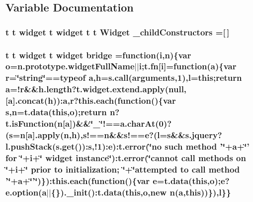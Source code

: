 \subsection{Variable Documentation}
\hypertarget{static_2root_2js_2bootstrap_2jquery-ui-1_810_84_8custom_8min_8js_a82e9fe96f4c63a640d414c9ea1d4fc32}{
\subsubsection[{\-\_\-child\-Constructors}]{ {\bf t} {\bf t} {\bf widget} {\bf t} {\bf widget} {\bf t} {\bf t} {\bf Widget} \-\_\-child\-Constructors =\mbox{[}$\,$\mbox{]}}}\label{static_2root_2js_2bootstrap_2jquery-ui-1_810_84_8custom_8min_8js_a82e9fe96f4c63a640d414c9ea1d4fc32}
\hypertarget{static_2root_2js_2bootstrap_2jquery-ui-1_810_84_8custom_8min_8js_a937dfd5a26af72e715911d045dbd0f69}{
\subsubsection[{bridge}]{ {\bf t} {\bf t} {\bf widget} {\bf t} {\bf widget} bridge =function({\bf i},{\bf n})\{var {\bf o}=n.\-prototype.\-widget\-Full\-Name$\vert$$\vert${\bf i};{\bf t.\-fn}\mbox{[}{\bf i}\mbox{]}=function({\bf a})\{var {\bf r}=\char`\"{}string\char`\"{}==typeof {\bf a},{\bf h}={\bf s.\-call}(arguments,1),{\bf l}=this;return {\bf a}=!{\bf r}\&\&h.\-length?t.\-widget.\-extend.\-apply(null,\mbox{[}{\bf a}\mbox{]}.concat({\bf h}))\-:{\bf a},{\bf r}?{\bf this.\-each}(function()\{var {\bf s},{\bf n}={\bf t.\-data}(this,{\bf o});return {\bf n}?t.\-is\-Function({\bf n}\mbox{[}{\bf a}\mbox{]})\&\&\char`\"{}\-\_\-\char`\"{}!==a.\-char\-At(0)?({\bf s}={\bf n}\mbox{[}{\bf a}\mbox{]}.apply({\bf n},{\bf h}),s!=={\bf n}\&\&s!=={\bf e}?({\bf l}={\bf s}\&\&s.\-jquery?l.\-push\-Stack(s.\-get())\-:{\bf s},!1)\-:{\bf e})\-:{\bf t.\-error}(\char`\"{}no such method '\char`\"{}+a+\char`\"{}' for \char`\"{}+i+\char`\"{} widget instance\char`\"{})\-:t.\-error(\char`\"{}cannot {\bf call} methods {\bf on} \char`\"{}+i+\char`\"{} prior to initialization; \char`\"{}+\char`\"{}attempted to {\bf call} method '\char`\"{}+a+\char`\"{}'\char`\"{})\})\-:{\bf this.\-each}(function()\{var {\bf e}={\bf t.\-data}(this,{\bf o});{\bf e}?e.\-option({\bf a}$\vert$$\vert$\{\}).\-\_\-init()\-:{\bf t.\-data}(this,{\bf o},new {\bf n}({\bf a},this))\}),{\bf l}\}\}}}\label{static_2root_2js_2bootstrap_2jquery-ui-1_810_84_8custom_8min_8js_a937dfd5a26af72e715911d045dbd0f69}
